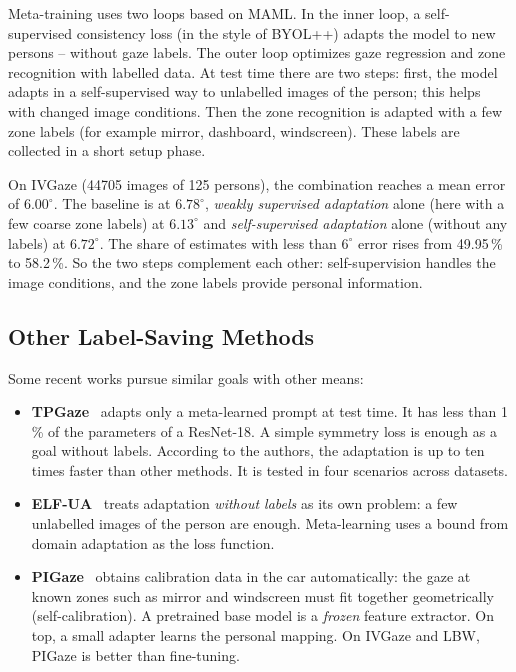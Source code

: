 Meta-training uses two loops based on MAML. In the inner loop, a
self-supervised consistency loss (in the style of BYOL++) adapts the model to
new persons -- without gaze labels. The outer loop optimizes gaze regression
and zone recognition with labelled data. At test time there are two steps:
first, the model adapts in a self-supervised way to unlabelled images of the
person; this helps with changed image conditions. Then the zone recognition is
adapted with a few zone labels (for example mirror, dashboard, windscreen).
These labels are collected in a short setup phase.

On IVGaze (\num{44705} images of 125 persons), the combination reaches a mean
error of $6.00^\circ$. The baseline is at $6.78^\circ$, \emph{weakly supervised
adaptation} alone (here with a few coarse zone labels) at $6.13^\circ$ and
\emph{self-supervised adaptation} alone (without any labels) at $6.72^\circ$. The share of estimates with less than $6^\circ$ error rises from
49.95\,\% to 58.2\,\%. So the two steps complement each other: self-supervision
handles the image conditions, and the zone labels provide personal
information.

\subsection{Other Label-Saving Methods}
\label{subsec:tta_weitere}
Some recent works pursue similar goals with other means:
\begin{itemize}
  \item \textbf{TPGaze}~\cite{liu2024tpgaze} adapts only a meta-learned prompt
        at test time. It has less than 1\,\% of the parameters of a ResNet-18.
        A simple symmetry loss is enough as a goal without labels. According to
        the authors, the adaptation is up to ten times faster than other
        methods. It is tested in four scenarios across datasets.
  \item \textbf{ELF-UA}~\cite{wu2024elfua} treats adaptation \emph{without
        labels} as its own problem: a few unlabelled images of the person are
        enough. Meta-learning uses a bound from domain adaptation as the loss
        function.
  \item \textbf{PIGaze}~\cite{wang2026pigaze} obtains calibration data in the
        car automatically: the gaze at known zones such as mirror and
        windscreen must fit together geometrically (self-calibration). A
        pretrained base model is a \emph{frozen} feature extractor. On top, a
        small adapter learns the personal mapping. On IVGaze and LBW, PIGaze is
        better than fine-tuning.
\end{itemize}

